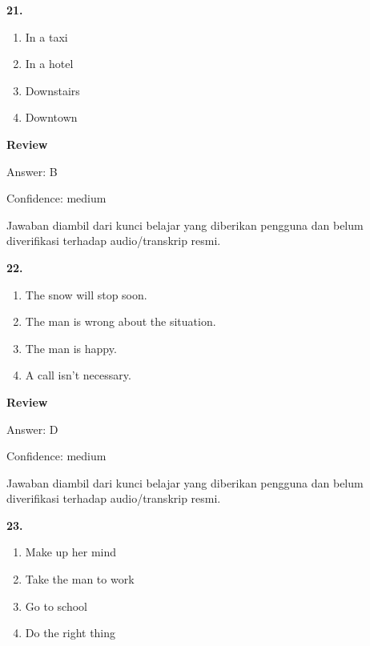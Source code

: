 \documentclass[12pt]{article}
\begin{document}
\endgroup
\par
\vspace{0.25\baselineskip}
\noindent\textbf{21.}
\begin{enumerate}[label=(\Alph*),leftmargin=*,itemsep=0.2em]
\item In a taxi
\item In a hotel
\item Downstairs
\item Downtown
\end{enumerate}
\par
\begingroup
\setlength{\parskip}{0pt}
\setlength{\parindent}{0pt}
\textbf{Review}\par
Answer: B\par
Confidence: medium\par
Jawaban diambil dari kunci belajar yang diberikan pengguna dan belum diverifikasi terhadap audio/transkrip resmi.\par
\endgroup
\par
\vspace{0.25\baselineskip}
\noindent\textbf{22.}
\begin{enumerate}[label=(\Alph*),leftmargin=*,itemsep=0.2em]
\item The snow will stop soon.
\item The man is wrong about the situation.
\item The man is happy.
\item A call isn't necessary.
\end{enumerate}
\par
\begingroup
\setlength{\parskip}{0pt}
\setlength{\parindent}{0pt}
\textbf{Review}\par
Answer: D\par
Confidence: medium\par
Jawaban diambil dari kunci belajar yang diberikan pengguna dan belum diverifikasi terhadap audio/transkrip resmi.\par
\endgroup
\par
\vspace{0.25\baselineskip}
\noindent\textbf{23.}
\begin{enumerate}[label=(\Alph*),leftmargin=*,itemsep=0.2em]
\item Make up her mind
\item Take the man to work
\item Go to school
\item Do the right thing
\end{enumerate}
\par
\end{document}
